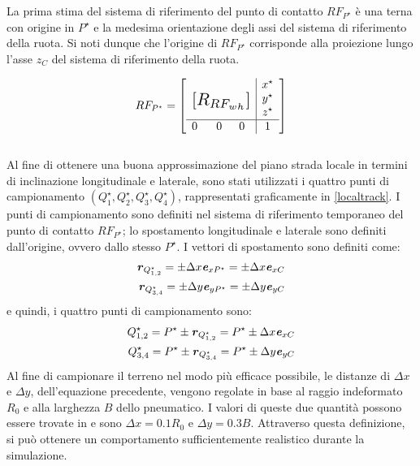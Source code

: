 La prima stima del sistema di riferimento del punto di contatto $RF_{P^\star}$ è una terna con origine in $P^\star$ e la medesima orientazione degli assi del sistema di riferimento della ruota. Si noti dunque che l'origine di $RF_{P^\star}$ corrisponde alla proiezione lungo l'asse $z_C$ del sistema di riferimento della ruota.

\begin{equation}
RF_{P^\star} = \left[
\begin{array}{ccc|c}
& & & x^\star\\
\multicolumn{3}{c|}{\multirow{3}{*}{\raisebox{20mm}{\scalebox{1.5}{$[R_{RF_{wh}}]$}}}} & y^\star\\
& & & z^\star\\ \hline
0 & ~~0 & 0 & 1
\end{array}\right]
\end{equation}\\

Al fine di ottenere una buona approssimazione del piano strada locale in termini di inclinazione longitudinale e laterale, sono stati utilizzati i quattro punti di campionamento $(Q^\star_1, Q^\star_2, Q^\star_3, Q^\star_4)$, rappresentati graficamente in \figurename{ \ref{localtrack}}. I punti di campionamento sono definiti nel sistema di riferimento temporaneo del punto di contatto $RF_{P^\star}$; lo spostamento longitudinale e laterale sono definiti dall'origine, ovvero dallo stesso $P^\star$. I vettori di spostamento sono definiti come:
%
\begin{equation}
\begin{split}
\textbf{\textit{r}}_{Q^\star_{1,2}} = \pm \Delta x \textbf{\textit{e}}_{xP^\star} = \pm \Delta x \textbf{\textit{e}}_{xC} \\
\textbf{\textit{r}}_{Q^\star_{3,4}} = \pm \Delta y \textbf{\textit{e}}_{yP^\star} = \pm \Delta y \textbf{\textit{e}}_{yC}
\end{split}
\end{equation}
%
e quindi, i quattro punti di campionamento sono:
%
\begin{equation}
\begin{split}
Q^\star_{1,2} = P^\star \pm \textbf{\textit{r}}_{Q^\star_{1,2}} = P^\star \pm \Delta x \textbf{\textit{e}}_{xC} \\
Q^\star_{3,4} = P^\star \pm \textbf{\textit{r}}_{Q^\star_{3,4}} = P^\star \pm \Delta y \textbf{\textit{e}}_{yC}
\end{split}
\end{equation}
%
Al fine di campionare il terreno nel modo più efficace possibile, le distanze di $\Delta x$ e $\Delta y$, dell'equazione precedente, vengono regolate in base al raggio indeformato $R_0$ e alla larghezza $B$ dello pneumatico. I valori di queste due quantità possono essere trovate in \cite{Rill} e sono $\Delta x = 0.1 R_0$ e $\Delta y = 0.3 B$. Attraverso questa definizione, si può ottenere un comportamento sufficientemente realistico durante la simulazione.

